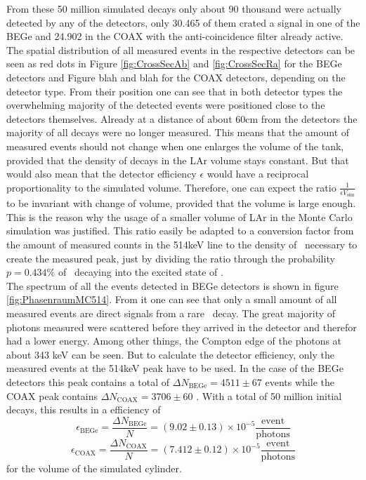 \documentclass[encoding=utf8,british]{tumphthesis}
\begin{document}
From these 50 million simulated decays only about 90 thousand were actually detected by any of the detectors, only 30.465 of them crated a signal in one of the BEGe and 24.902 in the COAX with the anti-coincidence filter already active.
The spatial distribution of all measured events in the respective detectors can be seen as red dots in Figure \ref{fig:CrossSecAb} and \ref{fig:CrossSecRa} for the BEGe detectors and Figure blah and blah for the COAX detectors, depending on the detector type.
From their position one can see that in both detector types the overwhelming majority of the detected events were positioned close to the detectors themselves.
Already at a distance of about 60cm from the detectors the majority of all decays were no longer measured.
This means that the amount of measured events should not change when one enlarges the volume of the tank, provided that the density of decays in the LAr volume stays constant.
But that would also mean that the detector efficiency $\epsilon$ would have a reciprocal proportionality to the simulated volume.
Therefore, one can expect the ratio $\frac{1}{\epsilon V_{\mathrm{sim}}}$ to be invariant with change of volume, provided that the volume is large enough.   
This is the reason why the usage of a smaller volume of LAr in the Monte Carlo simulation was justified.
This ratio easily be adapted to a conversion factor from the amount of measured counts in the 514keV line to the density of \Kr\ necessary to create the measured peak, just by dividing the ratio through the probability $p = 0.434\%$ of \Kr\ decaying into the excited state of .
\\

The spectrum of all the events detected in BEGe detectors is shown in figure \ref{fig:PhasenraumMC514}.
From it one can see that only a small amount of all measured events are direct signals from a rare \Kr\ decay. 
The great majority of photons measured were scattered before they arrived in the detector and therefor had a lower energy.
Among other things, the Compton edge of the photons at about 343 keV can be seen.
But to calculate the detector efficiency, only the measured events at the 514keV peak have to be used.
In the case of the BEGe detectors this peak contains a total of \(\Delta N_{\mathrm{BEGe}} = 4511\pm67\) events while the COAX peak contains  \(\Delta N_{\mathrm{COAX}} = 3706\pm60\) .
With a total of 50 million initial decays, this results in a efficiency of 
\begin{equation*}
\epsilon_{\mathrm{BEGe}} = \frac{\Delta N_{\mathrm{BEGe}}}{N} = (9.02\pm0.13) \times 10^{-5}  \frac{\mathrm{event}}{\mathrm{photons}}
\end{equation*}
\begin{equation*}
\epsilon_{\mathrm{COAX}} = \frac{\Delta N_{\mathrm{COAX}}}{N} = (7.412\pm0.12) \times 10^{-5}  \frac{\mathrm{event}}{\mathrm{photons}}
\end{equation*}
for the volume of the simulated cylinder.
\\
\end{document}
